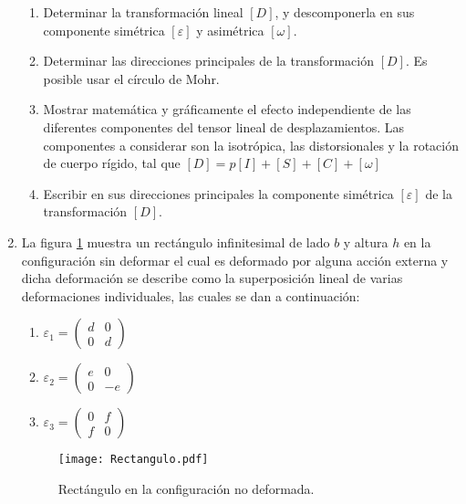 \documentclass[../notas medios.tex]{subfiles}
\begin{document}
\begin{enumerate}
\begin{enumerate}
\item Determinar la transformación lineal $[D]$, y descomponerla en sus componente simétrica $[\varepsilon]$ y asimétrica $[\omega]$.
\item Determinar las direcciones principales de la transformación $[D]$. Es 
posible usar el círculo de Mohr.
\item Mostrar matemática y gráficamente el efecto independiente de las diferentes componentes del tensor lineal de desplazamientos. Las componentes a considerar son la isotrópica, las distorsionales y la rotación de cuerpo rígido, tal que $[D] = p[I] + [S] +[C] + [\omega]$
\item Escribir en sus direcciones principales la componente simétrica $[\varepsilon]$ de la transformación $[D]$.
\end{enumerate}


\item  \label{punto03_d} La figura \cref{Rectangulo} muestra un rectángulo 
infinitesimal de lado $b$ y altura $h$ en la configuración sin deformar el 
cual es deformado por alguna acci\'on externa y dicha deformación se describe 
como la superposición lineal de varias deformaciones individuales, las cuales 
se dan a continuación: 
\begin{enumerate}
\item $ {\varepsilon_1}=\left(\begin{array}{ccc}
d & 0 \\ 
0 & d 
\end{array}\right) \enspace $

\item $ {\varepsilon_2}=\left(\begin{array}{ccc}
e & 0 \\ 
0 & -e 
\end{array}\right) \enspace $

\item ${\varepsilon_3}=\left(\begin{array}{ccc}
0 & f \\ 
f & 0 
\end{array}\right) \enspace $
\end{enumerate}
	
\begin{figure}[H]		
	\centering	
	\texttt{[image: Rectangulo.pdf]}
	\caption{Rectángulo en la configuración no deformada.}
	\label{Rectangulo}
\end{figure}


\end{enumerate}
\end{document}
